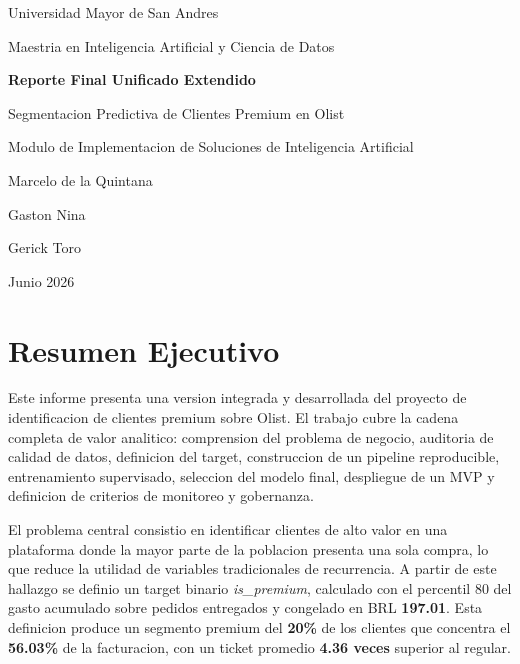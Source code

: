 \documentclass[12pt,letterpaper]{article}
\begin{document}
\begin{titlepage}
    \centering
    {\Large Universidad Mayor de San Andres\par}
    \vspace{0.4cm}
    {\large Maestria en Inteligencia Artificial y Ciencia de Datos\par}
    \vspace{1.2cm}
    {\Huge \textbf{Reporte Final Unificado Extendido}\par}
    \vspace{0.4cm}
    {\Large Segmentacion Predictiva de Clientes Premium en Olist\par}
    \vspace{1.2cm}
    {\large Modulo de Implementacion de Soluciones de Inteligencia Artificial\par}
    \vspace{1.2cm}
    {\large
        Marcelo de la Quintana\par
        Gaston Nina\par
        Gerick Toro\par
    }
    \vfill
    {\large Junio 2026\par}
\end{titlepage}

\tableofcontents
\newpage

\section{Resumen Ejecutivo}
Este informe presenta una version integrada y desarrollada del proyecto de identificacion de clientes premium sobre Olist. El trabajo cubre la cadena completa de valor analitico: comprension del problema de negocio, auditoria de calidad de datos, definicion del target, construccion de un pipeline reproducible, entrenamiento supervisado, seleccion del modelo final, despliegue de un MVP y definicion de criterios de monitoreo y gobernanza.

El problema central consistio en identificar clientes de alto valor en una plataforma donde la mayor parte de la poblacion presenta una sola compra, lo que reduce la utilidad de variables tradicionales de recurrencia. A partir de este hallazgo se definio un target binario \textit{is\_premium}, calculado con el percentil 80 del gasto acumulado sobre pedidos entregados y congelado en BRL \textbf{197.01}. Esta definicion produce un segmento premium del \textbf{20\%} de los clientes que concentra el \textbf{56.03\%} de la facturacion, con un ticket promedio \textbf{4.36 veces} superior al regular.
\end{document}
